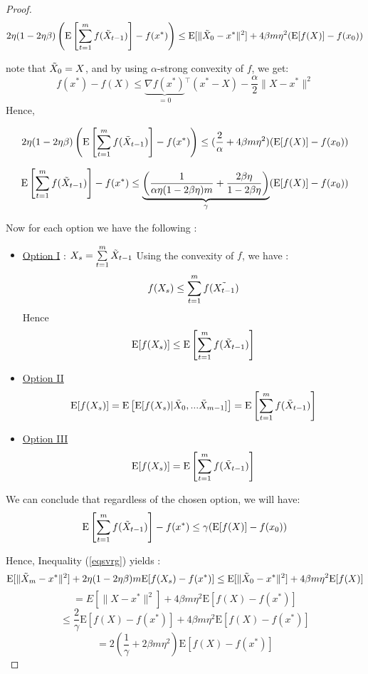 \documentclass[12pt]{report}
\newcommand{\E}{\mathrm{E}}
\begin{document}
\begin{proof}
\begin{equation}\label{eqsvrg}
2\eta(1-2\eta\beta)\left(\E\left[\sum\limits_{t=1}^mf(\Tilde{X}_{t-1})\right]-f(x^*)\right) \leq \E[\|\Tilde{X}_0-x^* \|^2]+4\beta m \eta^2(\E[f(X)]-f(x_0))
\end{equation}

note that $\Tilde{X}_0=X$, and by using $\alpha$-strong convexity of $f$, we get:
$$f(x^*)-f(X)\leq \underbrace{\nabla f(x^*)}_{=0}{}^ \top(x^*-X)-\frac{\alpha}{2}\|X-x^*\|^2 $$
Hence,

\begin{equation}
    2\eta(1-2\eta\beta)\left(\E\left[\sum\limits_{t=1}^mf(\Tilde{X}_{t-1})\right]-f(x^*)\right) \leq (\frac{2}{\alpha}+4\beta m \eta^2)(\E[f(X)]-f(x_0))
\end{equation}



\begin{equation}
   \E\left[\sum\limits_{t=1}^mf(\Tilde{X}_{t-1})\right]-f(x^*) \leq \underbrace{\left(\frac{1}{\alpha\eta(1-2\beta\eta)m}+\frac{2\beta\eta}{1-2\beta\eta}\right)}_{\gamma}(\E[f(X)]-f(x_0))
\end{equation}


Now for each option we have the following :
\begin{itemize}
    \item  \underline{Option I} : $X_s=\sum\limits_{t=1}^m \Tilde{X}_{t-1}$
    Using the convexity of $f$, we have :
    $$f(X_s)\leq \sum\limits_{t=1}^m f(\Tilde{X_{t-1}})$$
    Hence 
    $$\E[f(X_s)]\leq \E\left[\sum\limits_{t=1}^m f(\Tilde{X}_{t-1})\right]$$
    
    \item \underline{Option II}
    $$\E[f(X_s)]=\E\left[\E[f(X_s)|\Tilde{X}_0,...\Tilde{X}_{m-1}]\right]=\E\left[\sum\limits_{t=1}^mf(\Tilde{X}_{t-1})\right]    $$
    \item \underline{Option III}
    $$\E[f(X_s)]=\E\left[\sum\limits_{t=1}^mf(\Tilde{X}_{t-1})\right]    $$

\end{itemize}

We can conclude that regardless of the chosen option, we will  have:
$$   \E\left[\sum\limits_{t=1}^mf(\Tilde{X}_{t-1})\right]-f(x^*) \leq \gamma(\E[f(X)]-f(x_0))  $$


Hence, Inequality (\ref{eqsvrg}) yields : 
$$\E[\|\Tilde{X}_m-x^* \|^2]+2\eta(1-2\eta\beta)m\E[f(X_s)-f(x^*)] \leq \E[\|\Tilde{X}_0-x^* \|^2]+4\beta m \eta^2\E[f(X) ]$$
$$=E[\|X-x^*\|^2]+4\beta m\eta^2 \E[f(X)-f(x^*)]$$
$$\leq \frac{2}{\gamma} \E[f(X)-f(x^*)]+4\beta m \eta^2\E[f(X)-f(x^*)]$$
$$=2\left(\frac{1}{\gamma}+2\beta m \eta^2\right)\E[f(X)-f(x^*)]$$


\end{proof}
\end{document}

